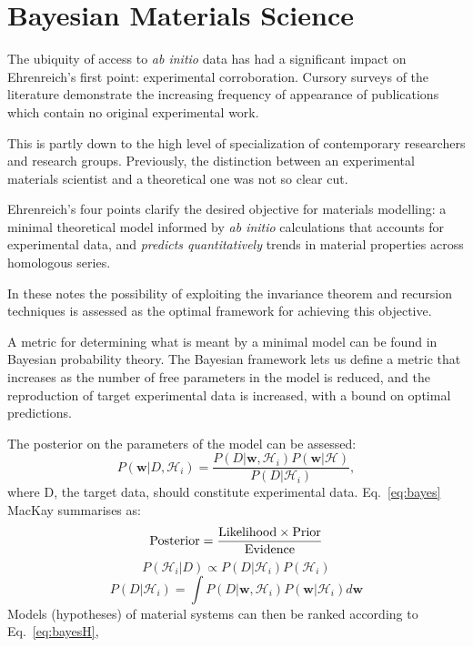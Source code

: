 \section{Bayesian Materials Science}
The ubiquity of access to {\it ab initio} data has had a significant impact on 
Ehrenreich's first point: experimental corroboration. 
Cursory surveys of the literature demonstrate the increasing frequency of 
appearance of publications which contain no original experimental work. 

This is partly down to the high level of specialization of contemporary 
researchers and research groups. Previously, the distinction between
an experimental materials scientist and a theoretical one was not so clear cut. 

Ehrenreich's four points clarify the desired objective for materials modelling:
a minimal theoretical model informed by {\it ab initio} calculations that accounts for 
experimental data, and {\it predicts quantitatively} trends in material properties
across homologous series. 

In these notes the possibility of exploiting the invariance theorem 
and recursion techniques is assessed as the optimal framework
for achieving this objective. 

A metric for determining what is meant by a minimal model
can be found in Bayesian probability theory. The Bayesian framework 
lets us define a metric that increases as the number of free 
parameters in the model is reduced, and the reproduction of 
target experimental data is increased, with a bound on optimal predictions.

The posterior on the parameters of the model can be assessed:
%
\begin{equation}
\label{eq:bayes}
P(\mathbf{w}|D, \mathcal{H}_{i}) = 
\frac{P(D|\mathbf{w}, \mathcal{H}_{i})P(\mathbf{w}|\mathcal{H})}{P(D|\mathcal{H}_{i})},
\end{equation}
%
where D, the target data, should constitute experimental data. 
Eq.~\ref{eq:bayes} MacKay summarises as:
%
\begin{equation}
{\rm Posterior} = \frac{{\rm Likelihood} \times {\rm Prior}}{{\rm Evidence}}
\end{equation}
%
\begin{equation}
\label{eq:bayesH}
P(\mathcal{H}_{i}|D) \propto P(D|\mathcal{H}_{i})P(\mathcal{H}_{i})
\end{equation}
%
\begin{equation}
\label{eq:bayesH}
P(D|\mathcal{H}_{i}) = \int P(D|\mathbf{w}, \mathcal{H}_{i})P(\mathbf{w}|\mathcal{H}_{i})d\mathbf{w}
\end{equation}
%
Models (hypotheses) of material systems can then be ranked according to Eq.~\ref{eq:bayesH},  

